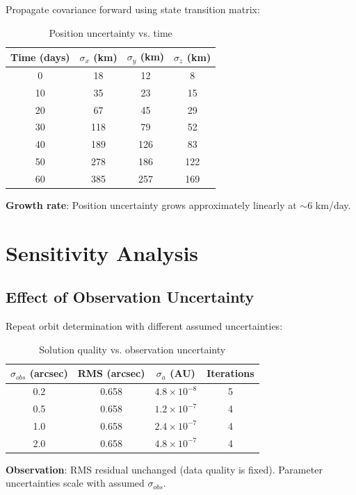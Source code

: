Propagate covariance forward using state transition matrix:

\begin{table}[htbp]
\centering
\caption{Position uncertainty vs. time}
\begin{tabular}{cccc}
\hline
\textbf{Time (days)} & \textbf{$\sigma_x$ (km)} & \textbf{$\sigma_y$ (km)} & \textbf{$\sigma_z$ (km)} \\
\hline
0 & 18 & 12 & 8 \\
10 & 35 & 23 & 15 \\
20 & 67 & 45 & 29 \\
30 & 118 & 79 & 52 \\
40 & 189 & 126 & 83 \\
50 & 278 & 186 & 122 \\
60 & 385 & 257 & 169 \\
\hline
\end{tabular}
\end{table}

\textbf{Growth rate}: Position uncertainty grows approximately linearly at $\sim 6$ km/day.

\section{Sensitivity Analysis}

\subsection{Effect of Observation Uncertainty}

Repeat orbit determination with different assumed uncertainties:

\begin{table}[htbp]
\centering
\caption{Solution quality vs. observation uncertainty}
\begin{tabular}{cccc}
\hline
\textbf{$\sigma_{obs}$ (arcsec)} & \textbf{RMS (arcsec)} & \textbf{$\sigma_a$ (AU)} & \textbf{Iterations} \\
\hline
0.2 & 0.658 & $4.8 \times 10^{-8}$ & 5 \\
0.5 & 0.658 & $1.2 \times 10^{-7}$ & 4 \\
1.0 & 0.658 & $2.4 \times 10^{-7}$ & 4 \\
2.0 & 0.658 & $4.8 \times 10^{-7}$ & 4 \\
\hline
\end{tabular}
\end{table}

\textbf{Observation}: RMS residual unchanged (data quality is fixed). Parameter uncertainties scale with assumed $\sigma_{obs}$.

